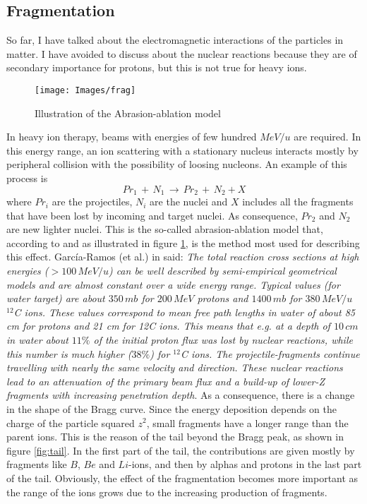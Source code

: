 \documentclass[12pt, a4paper, twoside]{book}
\begin{document}
\subsection{Fragmentation}
So far, I have talked about the electromagnetic interactions of the particles in matter. I have avoided to discuss about the nuclear reactions because they are of secondary importance for protons, but this is not true for heavy ions.
\begin{figure}[!t]
{\texttt{[image: Images/frag]}}
\caption{Illustration of the Abrasion-ablation model}
\label{fig:frag}
\end{figure}
In heavy ion therapy, beams with energies of few hundred $MeV/u$ are required. In this energy range, an ion scattering with a stationary nucleus interacts mostly by peripheral collision with the possibility of loosing nucleons.
An example of this process is
\[
Pr_1\,+\,N_1 \, \rightarrow\, Pr_2 \,+\, N_2 + X
\]
where $Pr_i$ are the projectiles, $N_i$ are the nuclei and $X$ includes all the fragments that have been lost by incoming and target nuclei. As consequence, $Pr_2$ and $N_2$ are new lighter nuclei.
This is the so-called abrasion-ablation model that, according to \cite{serb:nucRea} and as illustrated in figure \ref{fig:frag}, is the method most used for describing this effect.
García-Ramos (et al.) in \cite{garc:nucu} said: \emph{The total reaction cross sections at high energies ($>100\,MeV/u$) can be well described by semi-empirical geometrical models and are almost constant over a wide energy range. Typical values (for water target) are about $350\, mb$ for $200\,MeV$ protons and $1400\,mb$ for $380\,MeV/u$ $^{12}$C ions. These values correspond to mean free path lengths in water of about 85 cm for protons and 21 cm for 12C ions. This means that e.g. at a depth of $10\,cm$ in water about $11\%$ of the initial proton flux was lost by nuclear reactions, while this number is much higher ($38\%$) for $^{12}$C ions.
The projectile-fragments continue travelling with nearly the same velocity and direction. These nuclear reactions lead to an attenuation of the primary beam flux and a build-up of lower-Z fragments with increasing penetration depth}.
As a consequence, there is a change in the shape of the Bragg curve. Since the energy deposition depends on the charge of the particle squared $z^2$, small fragments have a longer range than the parent ions. This is the reason of the tail beyond the Bragg peak, as shown in figure \ref{fig:tail}. 
In the first part of the tail, the contributions are given mostly by fragments like $B$, $Be$ and $Li$-ions, and then by alphas and protons in the last part of the tail.
Obviously, the effect of the fragmentation becomes more important as the range of the ions grows due to the increasing production of fragments.
\end{document}
